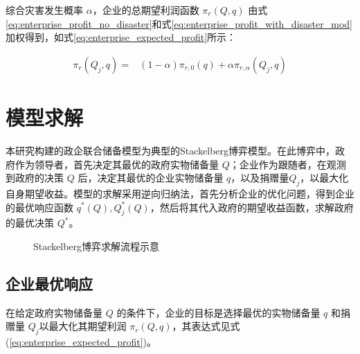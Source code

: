 \documentclass[a4paper,8pt,twocolumn]{article} %
\begin{document}
综合灾害发生概率 $\alpha$，企业的总期望利润函数 $\pi_r(Q,q)$ 由式\eqref{eq:enterprise_profit_no_disaster}和式\eqref{eq:enterprise_profit_with_disaster_mod}加权得到，如式\eqref{eq:enterprise_expected_profit}所示：
\begin{small}
    \begin{align} \label{eq:enterprise_expected_profit}
{\pi}_r(Q_j,q) = & (1-\alpha){\pi}_{r,0}(q) + \alpha{\pi}_{r,\alpha}(Q_j,q) 
\end{align}
\end{small}

\section{模型求解}

本研究构建的政企联合储备模型为典型的Stackelberg博弈模型。在此博弈中，政府作为领导者，首先决定其最优的政府实物储备量 $Q$；企业作为跟随者，在观测到政府的决策 $Q$ 后，决定其最优的企业实物储备量 $q$，以及捐赠量$Q_j$，以最大化自身期望收益。模型的求解采用逆向归纳法\cite{balcik2010coordination}，首先分析企业的优化问题，得到企业的最优响应函数 $q^*(Q), Q_j^*(Q)$，然后将其代入政府的期望收益函数，求解政府的最优决策 $Q^*$。
\begin{figure}[H] %
\centering
{}
\caption{Stackelberg博弈求解流程示意}
\label{fig:solution_process}
\end{figure}

\subsection{企业最优响应}
在给定政府实物储备量 $Q$ 的条件下，企业的目标是选择最优的实物储备量 $q$ 和捐赠量 $Q_j$以最大化其期望利润 $\pi_r(Q,q)$，其表达式见式(\ref{eq:enterprise_expected_profit})。
\end{document}
